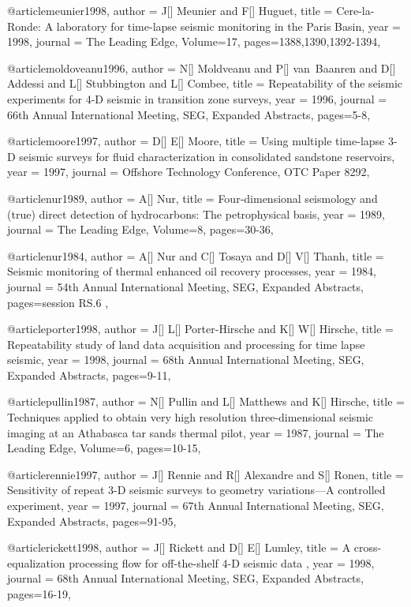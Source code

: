 @article{meunier1998,
  author =	 {J[] Meunier and F[] Huguet},
  title =	 {Cere-la-Ronde: A laboratory for time-lapse seismic monitoring in the Paris Basin},
  year =	 1998,
  journal =	 {The Leading Edge},
    Volume=17,
 pages=1388,1390,1392-1394,
}

@article{moldoveanu1996,
  author =	 {N[] Moldveanu and P[] van~Baanren and D[] Addessi and L[] Stubbington and L[] Combee},
  title =	 {Repeatability of the seismic experiments for 4-D
seismic in transition zone surveys},
  year =	 1996,
  journal =	 {66th Annual International Meeting, SEG, Expanded Abstracts},
 pages=5-8,
}


@article{moore1997,
  author =	 {D[] E[] Moore},
  title =	 {Using multiple time-lapse 3-D seismic surveys for
fluid characterization in consolidated sandstone reservoirs},
  year =	 1997,
  journal =	 {Offshore Technology Conference, OTC Paper 8292},
}

@article{nur1989,
  author =	 {A[] Nur},
  title =	 {Four-dimensional seismology and (true) direct detection
of hydrocarbons: The petrophysical basis},
  year =	 1989,
  journal =	 {The Leading Edge},
    Volume=8,
 pages=30-36,
}

@article{nur1984,
  author =	 {A[] Nur and C[] Tosaya and D[] V[] Thanh},
  title =	 {Seismic monitoring of thermal enhanced oil recovery processes},
  year =	 1984,
  journal =	 {54th Annual International Meeting, SEG, Expanded Abstracts},
 pages=session RS.6
,
}

@article{porter1998,
  author =	 {J[] L[] Porter-Hirsche and K[] W[] Hirsche},
  title =	 {Repeatability study of land data acquisition and processing for time lapse seismic},
  year =	 1998,
  journal =	 {68th Annual International Meeting, SEG, Expanded Abstracts},
 pages=9-11,
}

@article{pullin1987,
  author =	 {N[] Pullin and L[] Matthews and K[] Hirsche},
  title =	 {Techniques applied to obtain very high resolution three-dimensional seismic imaging at an Athabasca tar sands thermal pilot},
  year =	 1987,
  journal =	 {The Leading Edge},
    Volume=6,
 pages=10-15,
}

@article{rennie1997,
  author =	 {J[] Rennie and R[] Alexandre and S[] Ronen},
  title =	 { Sensitivity of repeat 3-D seismic surveys to geometry variations—A controlled experiment},
  year =	 1997,
  journal =	 {67th Annual International Meeting, SEG, Expanded Abstracts},
 pages=91-95,
}

@article{rickett1998,
  author =	 {J[] Rickett and D[] E[] Lumley},
  title =	 { A cross-equalization processing flow for off-the-shelf 4-D seismic data },
  year =	 1998,
  journal =	 {68th Annual International Meeting, SEG, Expanded Abstracts},
 pages=16-19,
}

